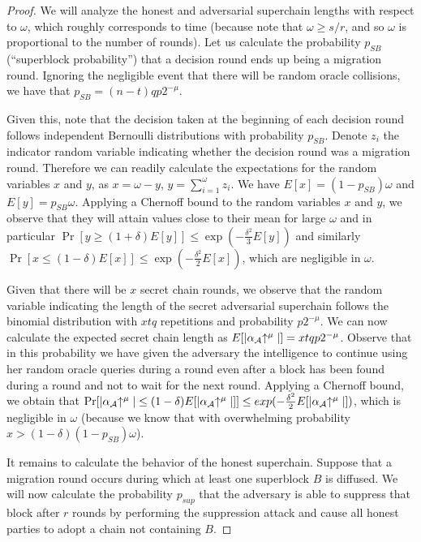 \begin{proof}
We will analyze the honest and adversarial superchain lengths with respect to
$\omega$, which roughly corresponds to time (because note that $\omega \geq
s/r$, and so $\omega$ is proportional to the number of rounds).
Let us calculate the probability $p_{SB}$ (``superblock probability'') that a
decision round ends up being a migration round. Ignoring the negligible event
that there will be random oracle collisions, we have that $p_{SB} = (n -
t)qp2^{-\mu}$.

Given this, note that the decision taken at the beginning of each decision round
follows independent Bernoulli distributions with probability $p_{SB}$. Denote
$z_i$ the indicator random variable indicating whether the decision round was
a migration round. Therefore we can readily calculate the expectations for the
random variables $x$ and $y$, as $x = \omega - y$, $y = \sum_{i=1}^\omega z_i$.
We have $E[x] = (1 - p_{SB})\omega$ and $E[y] = p_{SB}\omega$. Applying a
Chernoff bound to the random variables $x$ and $y$, we observe that they will
attain values close to their mean for large $\omega$ and in particular
$\Pr[y \geq (1 + \delta)E[y]] \leq \exp(-\frac{\delta^2}{3} E[y])$ and similarly
$\Pr[x \leq (1 - \delta)E[x]] \leq \exp(-\frac{\delta^2}{2} E[x])$, which are
negligible in $\omega$.

Given that there will be $x$ secret chain rounds, we observe that the random
variable indicating the length of the secret adversarial superchain follows the
binomial distribution with $xtq$ repetitions and probability $p2^{-\mu}$. We
can now calculate the expected secret chain length as
$E[|\alpha_\mathcal{A}\negthickspace\uparrow^\mu|] = xtqp2^{-\mu}$. Observe that in this
probability we have given the adversary the intelligence to continue using her
random oracle queries during a round even after a block has been found during a
round and not to wait for the next round. Applying a Chernoff bound, we obtain
that $\Pr[|\alpha_\mathcal{A}\negthickspace\uparrow^\mu| \leq (1 -
\delta)E[|\alpha_\mathcal{A}\negthickspace\uparrow^\mu|]] \leq
exp(-\frac{\delta^2}{2}E[|\alpha_\mathcal{A}\negthickspace\uparrow^\mu|])$, which is
negligible in $\omega$ (because we know that with overwhelming probability $x >
(1 - \delta)(1 - p_{SB})\omega$).

It remains to calculate the behavior of the honest superchain.
Suppose that a migration round occurs during which at least one superblock $B$
is diffused. We will now calculate the probability $p_{sup}$ that the adversary
is able to suppress that block after $r$ rounds by performing the suppression
attack and cause all honest parties to adopt a chain not containing $B$.


\end{proof}
